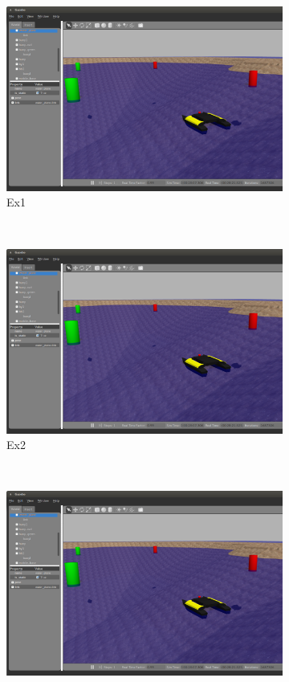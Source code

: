 \documentclass[11pt]{article}
\begin{document}
\begin{figure}[h]
  \centering
  \begin{subfigure}[t]{0.3\textwidth}
    \includegraphics[width=\textwidth]{example.png}
    \caption{Ex1}
  \end{subfigure}
  ~
  \begin{subfigure}[t]{0.3\textwidth}
    \includegraphics[width=\textwidth]{example.png}
    \caption{Ex2}
  \end{subfigure}
  ~
  \begin{subfigure}[t]{0.3\textwidth}
    \includegraphics[width=\textwidth]{example.png}

\end{subfigure}
\end{figure}
\end{document}
